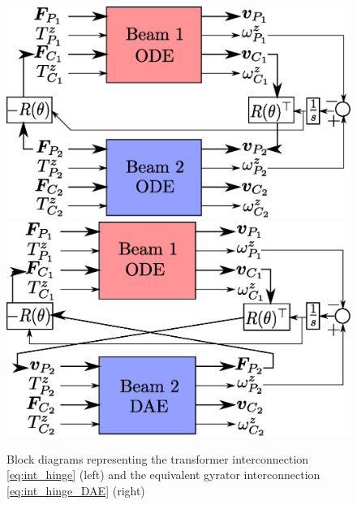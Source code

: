 \documentclass{svjour3}                     %
\begin{document}
\begin{figure}[t]
	\centering
	\includegraphics[height=0.16\textheight]{block_hinged_beam.eps} \hspace{.5cm}
	\includegraphics[height=0.16\textheight]{block_hinged_beam_DAE.eps} 	
	\caption{Block diagrams representing the transformer interconnection \eqref{eq:int_hinge} (left) and the equivalent gyrator interconnection \eqref{eq:int_hinge_DAE} (right)}
	\label{fig:beam_int_block}
\end{figure}
\end{document}
